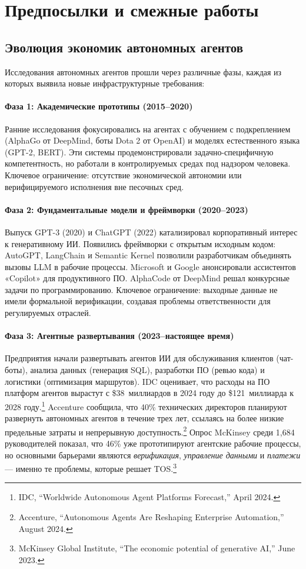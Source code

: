 \documentclass[11pt]{article}
\begin{document}
\section{Предпосылки и смежные работы}
\subsection{Эволюция экономик автономных агентов}
Исследования автономных агентов прошли через различные фазы, каждая из которых выявила новые инфраструктурные требования:

\paragraph{Фаза 1: Академические прототипы (2015--2020)} Ранние исследования фокусировались на агентах с обучением с подкреплением (AlphaGo от DeepMind, боты Dota 2 от OpenAI) и моделях естественного языка (GPT-2, BERT). Эти системы продемонстрировали задачно-специфичную компетентность, но работали в контролируемых средах под надзором человека. Ключевое ограничение: отсутствие экономической автономии или верифицируемого исполнения вне песочных сред.

\paragraph{Фаза 2: Фундаментальные модели и фреймворки (2020--2023)} Выпуск GPT-3 (2020) и ChatGPT (2022) катализировал корпоративный интерес к генеративному ИИ. Появились фреймворки с открытым исходным кодом: AutoGPT, LangChain и Semantic Kernel позволили разработчикам объединять вызовы LLM в рабочие процессы. Microsoft и Google анонсировали ассистентов «Copilot» для продуктивного ПО. AlphaCode от DeepMind решал конкурсные задачи по программированию. Ключевое ограничение: выходные данные не имели формальной верификации, создавая проблемы ответственности для регулируемых отраслей.

\paragraph{Фаза 3: Агентные развертывания (2023--настоящее время)} Предприятия начали развертывать агентов ИИ для обслуживания клиентов (чат-боты), анализа данных (генерация SQL), разработки ПО (ревью кода) и логистики (оптимизация маршрутов). IDC оценивает, что расходы на ПО платформ агентов вырастут с \$38~миллиардов в 2024 году до \$121~миллиарда к 2028 году.\footnote{IDC, ``Worldwide Autonomous Agent Platforms Forecast,'' April 2024.} Accenture сообщила, что 40\% технических директоров планируют развернуть автономных агентов в течение трех лет, ссылаясь на более низкие предельные затраты и непрерывную доступность.\footnote{Accenture, ``Autonomous Agents Are Reshaping Enterprise Automation,'' August 2024.} Опрос McKinsey среди 1,684 руководителей показал, что 46\% уже прототипируют агентские рабочие процессы, но основными барьерами являются \emph{верификация}, \emph{управление данными} и \emph{платежи} — именно те проблемы, которые решает TOS.\footnote{McKinsey Global Institute, ``The economic potential of generative AI,'' June 2023.}
\end{document}
